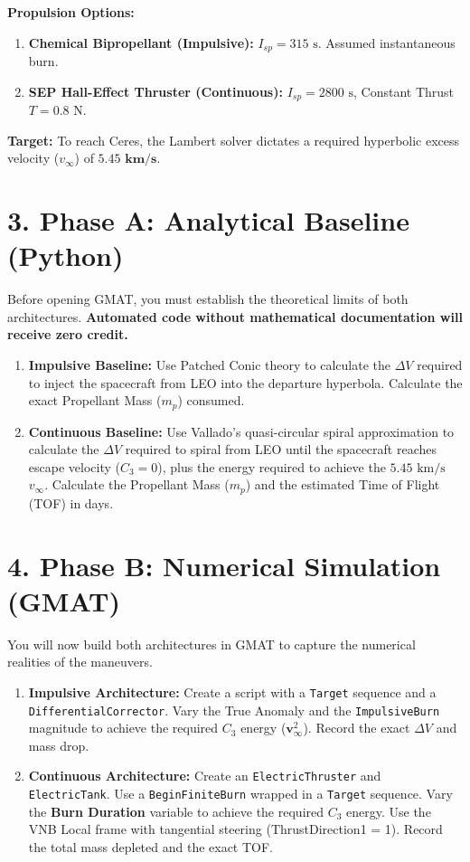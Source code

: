 \documentclass[11pt, letterpaper]{article}
\begin{document}
\textbf{Propulsion Options:}
\begin{enumerate}
    \item \textbf{Chemical Bipropellant (Impulsive):} $I_{sp} = 315 \text{ s}$. Assumed instantaneous burn.
    \item \textbf{SEP Hall-Effect Thruster (Continuous):} $I_{sp} = 2800 \text{ s}$, Constant Thrust $T = 0.8 \text{ N}$.
\end{enumerate}

\textbf{Target:} 
To reach Ceres, the Lambert solver dictates a required hyperbolic excess velocity ($v_\infty$) of $\boldsymbol{5.45 \text{ km/s}}$.

\section*{3. Phase A: Analytical Baseline (Python)}
Before opening GMAT, you must establish the theoretical limits of both architectures. \textbf{Automated code without mathematical documentation will receive zero credit.}

\begin{enumerate}[label=\textbf{A.\arabic*}]
    \item \textbf{Impulsive Baseline:} Use Patched Conic theory to calculate the $\Delta V$ required to inject the spacecraft from LEO into the departure hyperbola. Calculate the exact Propellant Mass ($m_p$) consumed.
    \item \textbf{Continuous Baseline:} Use Vallado's quasi-circular spiral approximation to calculate the $\Delta V$ required to spiral from LEO until the spacecraft reaches escape velocity ($C_3 = 0$), plus the energy required to achieve the $5.45 \text{ km/s}$ $v_\infty$. Calculate the Propellant Mass ($m_p$) and the estimated Time of Flight (TOF) in days.
\end{enumerate}

\section*{4. Phase B: Numerical Simulation (GMAT)}
You will now build both architectures in GMAT to capture the numerical realities of the maneuvers.

\begin{enumerate}[label=\textbf{B.\arabic*}]
    \item \textbf{Impulsive Architecture:} Create a script with a \texttt{Target} sequence and a \texttt{DifferentialCorrector}. Vary the True Anomaly and the \texttt{ImpulsiveBurn} magnitude to achieve the required $C_3$ energy ($\boldsymbol{v}_\infty^2$). Record the exact $\Delta V$ and mass drop.
    \item \textbf{Continuous Architecture:} Create an \texttt{ElectricThruster} and \texttt{ElectricTank}. Use a \texttt{BeginFiniteBurn} wrapped in a \texttt{Target} sequence. Vary the \textbf{Burn Duration} variable to achieve the required $C_3$ energy. Use the VNB Local frame with tangential steering (ThrustDirection1 = 1). Record the total mass depleted and the exact TOF.
\end{enumerate}
\end{document}
